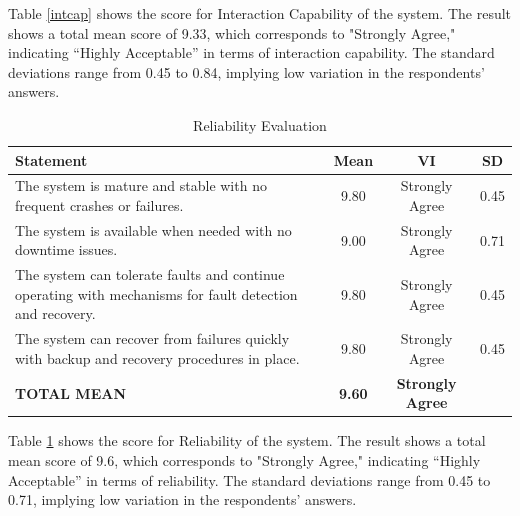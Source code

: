 Table \ref{intcap} shows the score for Interaction Capability of the system. The result shows a total mean score of 9.33, which corresponds to "Strongly Agree," indicating “Highly Acceptable” in terms of interaction capability. The standard deviations range from 0.45 to 0.84, implying low variation in the respondents’ answers.

\begin{table}[ht]
	\centering
	\caption{Reliability Evaluation}
	\label{relblty}
	\renewcommand{\arraystretch}{1.2}
	\begin{tabularx}{\linewidth}{|X|c|c|c|}
		\hline
		\textbf{Statement} & \textbf{Mean} & \textbf{VI} & \textbf{SD} \\ \hline
		The system is mature and stable with no frequent crashes or failures.
		& 9.80 & Strongly Agree & 0.45 \\ \hline
		The system is available when needed with no downtime issues.
		& 9.00 & Strongly Agree & 0.71 \\ \hline
		The system can tolerate faults and continue operating with mechanisms for fault detection and recovery.
		& 9.80 & Strongly Agree & 0.45 \\ \hline
		The system can recover from failures quickly with backup and recovery procedures in place.
		& 9.80 & Strongly Agree & 0.45\\ \hline
		\textbf{TOTAL MEAN} & \textbf{9.60} & \textbf{Strongly Agree} & \\ \hline
	\end{tabularx}
\end{table}

Table \ref{relblty} shows the score for Reliability of the system. The result shows a total mean score of 9.6, which corresponds to "Strongly Agree," indicating “Highly Acceptable” in terms of reliability. The standard deviations range from 0.45 to 0.71, implying low variation in the respondents’ answers.

